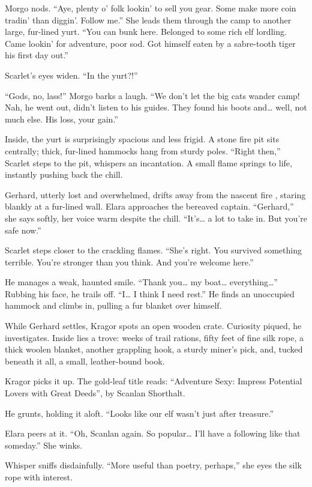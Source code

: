 \documentclass[
  letterpaper,12pt,twoside,twocolumn,openany,
  nodeprecatedcode,bg=full]{dndbook}
\begin{document}
Morgo nods. ``Aye, plenty o' folk lookin' to sell you gear. Some make
more coin tradin' than diggin'. Follow me.'' She leads them through the
camp to another large, fur-lined yurt. ``You can bunk here. Belonged to
some rich elf lordling. Came lookin' for adventure, poor sod. Got
himself eaten by a sabre-tooth tiger his first day out.''

Scarlet's eyes widen. ``In the yurt?!''

``Gods, no, lass!'' Morgo barks a laugh. ``We don't let the big cats
wander camp! Nah, he went out, didn't listen to his guides. They found
his boots and\ldots{} well, not much else. His loss, your gain.''

Inside, the yurt is surprisingly spacious and less frigid. A stone fire
pit sits centrally; thick, fur-lined hammocks hang from sturdy poles.
``Right then,'' Scarlet steps to the pit, whispers an incantation. A
small flame springs to life, instantly pushing back the chill.

Gerhard, utterly lost and overwhelmed, drifts away from the nascent fire
, staring blankly at a fur-lined wall. Elara approaches the bereaved
captain. ``Gerhard,'' she says softly, her voice warm despite the chill.
``It's\ldots{} a lot to take in. But you're safe now.''

Scarlet steps closer to the crackling flames. ``She's right. You
survived something terrible. You're stronger than you think. And you're
welcome here.''

He manages a weak, haunted smile. ``Thank you\ldots{} my boat\ldots{}
everything\ldots{}'' Rubbing his face, he trails off. ``I\ldots{} I
think I need rest.'' He finds an unoccupied hammock and climbs in,
pulling a fur blanket over himself.

While Gerhard settles, Kragor spots an open wooden crate. Curiosity
piqued, he investigates. Inside lies a trove: weeks of trail rations,
fifty feet of fine silk rope, a thick woolen blanket, another grappling
hook, a sturdy miner's pick, and, tucked beneath it all, a small,
leather-bound book.

Kragor picks it up. The gold-leaf title reads: ``Adventure Sexy: Impress
Potential Lovers with Great Deeds'', by Scanlan Shorthalt.

He grunts, holding it aloft. ``Looks like our elf wasn't just after
treasure.''

Elara peers at it. ``Oh, Scanlan again. So popular\ldots{} I'll have a
following like that someday.'' She winks.

Whisper sniffs disdainfully. ``More useful than poetry, perhaps,'' she
eyes the silk rope with interest.
\end{document}
